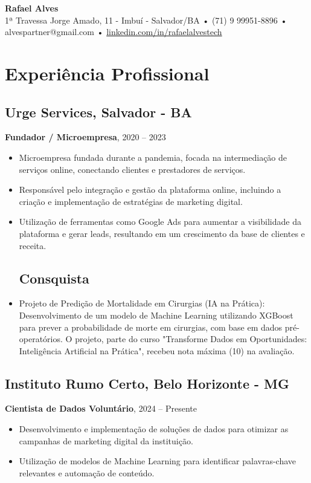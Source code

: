 \documentclass[a4paper,10pt]{article}
\begin{document}
\begin{center}
    \Huge \textbf{Rafael Alves} \\
    \normalsize
    1ª Travessa Jorge Amado, 11 - Imbuí - Salvador/BA • (71) 9 99951-8896 • alvespartner@gmail.com • \href{https://www.linkedin.com/in/rafaelalvestech}{linkedin.com/in/rafaelalvestech}
\end{center}



\section*{Experiência Profissional}

\subsection*{Urge Services, Salvador - BA}
\textbf{Fundador / Microempresa}, 2020 – 2023

\begin{itemize}[leftmargin=*]
    \item Microempresa fundada durante a pandemia, focada na intermediação de serviços online, conectando clientes e prestadores de serviços.
    \item Responsável pelo integração e gestão da plataforma online, incluindo a criação e implementação de estratégias de marketing digital.
    \item Utilização de ferramentas como Google Ads para aumentar a visibilidade da plataforma e gerar leads, resultando em um crescimento da base de clientes e receita.
\subsection{Consquista }
    \item Projeto de Predição de Mortalidade em Cirurgias (IA na Prática): Desenvolvimento de um modelo de Machine Learning utilizando XGBoost para prever a probabilidade de morte em cirurgias, com base em dados pré-operatórios. O projeto, parte do curso "Transforme Dados em Oportunidades: Inteligência Artificial na Prática", recebeu nota máxima (10) na avaliação. 
   
    
\end{itemize}

\subsection*{Instituto Rumo Certo, Belo Horizonte - MG}
\textbf{Cientista de Dados Voluntário}, 2024 – Presente
\begin{itemize}[leftmargin=*]
    \item Desenvolvimento e implementação de soluções de dados para otimizar as campanhas de marketing digital da instituição.
    \item Utilização de modelos de Machine Learning para identificar palavras-chave relevantes e automação de conteúdo.

\end{itemize}
\end{document}
